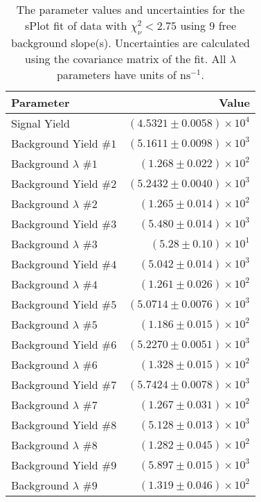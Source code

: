 
\begin{table}
    \begin{center}
        \begin{tabular}{lr}\toprule
            Parameter & Value \\\midrule
            Signal Yield & $(4.5321 \pm 0.0058) \times 10^{4}$ \\
            Background Yield $\#1$ & $(5.1611 \pm 0.0098) \times 10^{3}$ \\
            Background $\lambda$ $\#1$ & $(1.268 \pm 0.022) \times 10^{2}$ \\
            Background Yield $\#2$ & $(5.2432 \pm 0.0040) \times 10^{3}$ \\
            Background $\lambda$ $\#2$ & $(1.265 \pm 0.014) \times 10^{2}$ \\
            Background Yield $\#3$ & $(5.480 \pm 0.014) \times 10^{3}$ \\
            Background $\lambda$ $\#3$ & $(5.28 \pm 0.10) \times 10^{1}$ \\
            Background Yield $\#4$ & $(5.042 \pm 0.014) \times 10^{3}$ \\
            Background $\lambda$ $\#4$ & $(1.261 \pm 0.026) \times 10^{2}$ \\
            Background Yield $\#5$ & $(5.0714 \pm 0.0076) \times 10^{3}$ \\
            Background $\lambda$ $\#5$ & $(1.186 \pm 0.015) \times 10^{2}$ \\
            Background Yield $\#6$ & $(5.2270 \pm 0.0051) \times 10^{3}$ \\
            Background $\lambda$ $\#6$ & $(1.328 \pm 0.015) \times 10^{2}$ \\
            Background Yield $\#7$ & $(5.7424 \pm 0.0078) \times 10^{3}$ \\
            Background $\lambda$ $\#7$ & $(1.267 \pm 0.031) \times 10^{2}$ \\
            Background Yield $\#8$ & $(5.128 \pm 0.013) \times 10^{3}$ \\
            Background $\lambda$ $\#8$ & $(1.282 \pm 0.045) \times 10^{2}$ \\
            Background Yield $\#9$ & $(5.897 \pm 0.015) \times 10^{3}$ \\
            Background $\lambda$ $\#9$ & $(1.319 \pm 0.046) \times 10^{2}$ \\\bottomrule
        \end{tabular}
        \caption{The parameter values and uncertainties for the sPlot fit of data with $\chi^2_\nu < 2.75$ using 9 free background slope(s). Uncertainties are calculated using the covariance matrix of the fit. All $\lambda$ parameters have units of $\si{\nano\second}^{-1}$.}
    \end{center}
\end{table}
